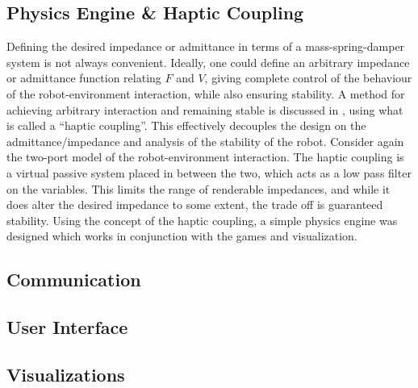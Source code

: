 \documentclass[12pt]{report}
\begin{document}
	

	\subsection{Physics Engine \& Haptic Coupling}
%

Defining the desired impedance or admittance in terms of a mass-spring-damper system is not always convenient. Ideally, one could define an arbitrary impedance or admittance function relating $F$ and $V$, giving complete control of the behaviour of the robot-environment interaction, while also ensuring stability. 
	A method for achieving arbitrary interaction and remaining stable is discussed in \cite{Adams1999}, using what is called a ``haptic coupling''. This effectively decouples the design on the admittance/impedance and analysis of the stability of the robot. 
	Consider again the two-port model of the robot-environment interaction. The haptic coupling is a virtual passive system placed in between the two, which acts as a low pass filter on the variables. This limits the range of renderable impedances, and while it does alter the desired impedance to some extent, the trade off is guaranteed stability. 
	Using the concept of the haptic coupling, a simple physics engine was designed which works in conjunction with the games and visualization. 

	\subsection{Communication} 
%


	\subsection{User Interface}
%
%
	\subsection{Visualizations}
%
	
\end{document}
